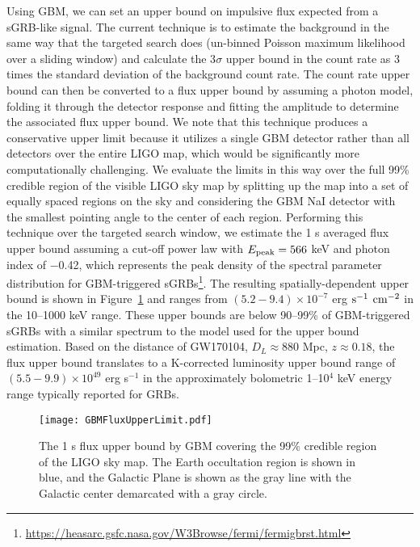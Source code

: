 \documentclass{aastex61}
\begin{document}
Using GBM, we can set an upper bound on impulsive flux expected from a sGRB-like signal.  The current technique is to estimate the background in the same way that the targeted search does (un-binned Poisson maximum likelihood over a sliding window) and calculate the 3$\sigma$ upper bound in the count rate as 3 times the standard deviation of the background count rate.  The count rate upper bound can then be converted to a flux upper bound by assuming a photon model, folding it through the detector response and fitting the amplitude to determine the associated flux upper bound.  We note that this technique produces a conservative upper limit because it utilizes a single GBM detector rather than all detectors over the entire LIGO map, which would be significantly more computationally challenging.  We evaluate the limits in this way over the full 99\% credible region of the visible LIGO sky map by splitting up the map into a set of equally spaced regions on the sky and considering the GBM NaI detector with the smallest pointing angle to the center of each region.  Performing this technique over the targeted search window, we estimate the 1 s averaged flux upper bound assuming a cut-off power law with $E_{\rm peak} = 566$ keV and photon index of $-$0.42, which represents the peak density of the spectral parameter distribution for GBM-triggered sGRBs\footnote{\url{https://heasarc.gsfc.nasa.gov/W3Browse/fermi/fermigbrst.html}}.  The resulting spatially-dependent upper bound is shown in Figure~\ref{GBMUpperLimit} and ranges from $(5.2-9.4)\times10^{-7}$ erg $\rm s^{-1}$ $\rm cm^{-2}$ in the 10--1000 keV range. These upper bounds are below 90--99\% of GBM-triggered sGRBs with a similar spectrum to the model used for the upper bound estimation. Based on the distance of GW170104, $D_L\approx880$ Mpc, $z\approx0.18$, the flux upper bound translates to a K-corrected luminosity upper bound range of $(5.5-9.9) \times 10^{49}$ erg s$^{-1}$ in the approximately bolometric 1--10$^4$ keV energy range typically reported for GRBs.
\begin{figure}
	\begin{center}
		\texttt{[image: GBMFluxUpperLimit.pdf]}
	\end{center}
\caption{The 1 s flux upper bound by GBM covering the 99\% credible region of the LIGO sky map.  The Earth occultation region is shown in blue, and the Galactic Plane is shown as the gray line with the Galactic center demarcated with a gray circle.
\label{GBMUpperLimit}}
\end{figure}
\end{document}
